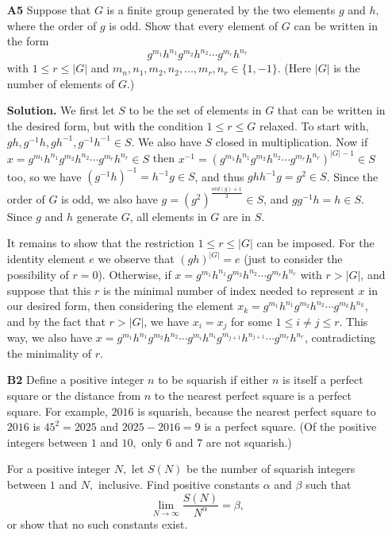 \documentclass[11pt,a4paper]{article}
\newcommand{\<}{\langle}
\renewcommand{\>}{\rangle}
\begin{document}
\begin{enumerate}
	\item[\textbf{A5}]Suppose that $G$ is a finite group generated by the two elements $g$ and $h,$ where the order of $g$ is odd. Show that every element of $G$ can be written in the form
	\[g^{m_1}h^{n_1}g^{m_2}h^{n_2}\cdots g^{m_r}h^{n_r}\]with $1\le r\le |G|$ and $m_n,n_1,m_2,n_2,\dots,m_r,n_r\in\{1,-1\}.$ (Here $|G|$ is the number of elements of $G.$)
	
	\textbf{Solution.} We first let $S$ to be the set of elements in $G$ that can be written in the desired form, but with the condition $1\le r\le G$ relaxed. To start with, $gh, g^{-1}h, gh^{-1}, g^{-1}h^{-1}\in S$. We also have $S$ closed in multiplication. 
	Now if $x=g^{m_1}h^{n_1}g^{m_2}h^{n_2}\cdots g^{m_r}h^{n_r}\in S$ then $x^{-1}=(g^{m_1}h^{n_1}g^{m_2}h^{n_2}\cdots g^{m_r}h^{n_r})^{|G|-1}\in S$ too, so we have $(g^{-1}h)^{-1}=h^{-1}g\in S$, and thus $ghh^{-1}g=g^2\in S$. Since the order of $G$ is odd, we also have $g=(g^2)^{\frac{ord(g)+1}{2}}\in S$, and $gg^{-1}h=h\in S$. Since $g$ and $h$ generate $G$, all elements in $G$ are in $S$. 
	
	It remains to show that the restriction $1\le r\le |G|$ can be imposed. For the identity element $e$ we observe that $(gh)^|G|=e$ (just to consider the possibility of $r=0$). Otherwise, if $x=g^{m_1}h^{n_1}g^{m_2}h^{n_2}\cdots g^{m_r}h^{n_r}$ with $r>|G|$, and suppose that this $r$ is the minimal number of index needed to represent $x$ in our desired form, then considering the element $x_k=g^{m_1}h^{n_1}g^{m_2}h^{n_2}\cdots g^{m_k}h^{n_k}$, and by the fact that $r>|G|$, we have $x_i=x_j$ for some $1\le i\neq j\le r$. This way, we also have 
	$x=g^{m_1}h^{n_1}g^{m_2}h^{n_2}\cdots g^{m_i}h^{n_i}g^{m_{j+1}}h^{n_{j+1}}\cdots g^{m_r}h^{n_r}$, contradicting the minimality of $r$. 
	
	\item[\textbf{B2}]Define a positive integer $n$ to be squarish if either $n$ is itself a perfect square or the distance from $n$ to the nearest perfect square is a perfect square. For example, $2016$ is squarish, because the nearest perfect square to $2016$ is $45^2=2025$ and $2025-2016=9$ is a perfect square. (Of the positive integers between $1$ and $10,$ only $6$ and $7$ are not squarish.)
	
	For a positive integer $N,$ let $S(N)$ be the number of squarish integers between $1$ and $N,$ inclusive. Find positive constants $\alpha$ and $\beta$ such that
	\[\lim_{N\to\infty}\frac{S(N)}{N^{\alpha}}=\beta,\]or show that no such constants exist.
	

\end{enumerate}
\end{document}
